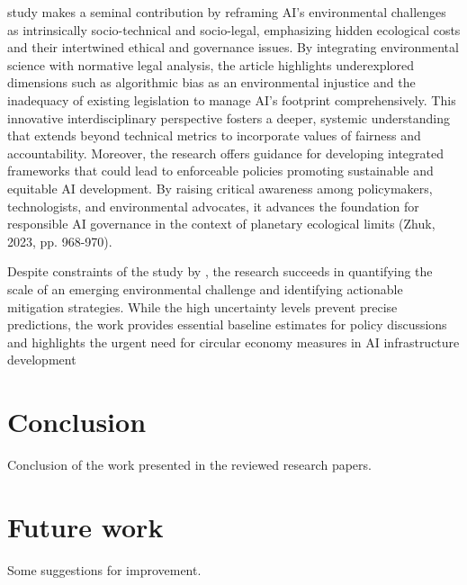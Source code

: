 \documentclass[a4paper, 12pt]{article}
\begin{document}
\par \citet{Zhuk2023} study makes a seminal contribution by reframing AI’s environmental challenges as intrinsically socio-technical and socio-legal, emphasizing hidden ecological costs and their intertwined ethical and governance issues. By integrating environmental science with normative legal analysis, the article highlights underexplored dimensions such as algorithmic bias as an environmental injustice and the inadequacy of existing legislation to manage AI’s footprint comprehensively. This innovative interdisciplinary perspective fosters a deeper, systemic understanding that extends beyond technical metrics to incorporate values of fairness and accountability. Moreover, the research offers guidance for developing integrated frameworks that could lead to enforceable policies promoting sustainable and equitable AI development. By raising critical awareness among policymakers, technologists, and environmental advocates, it advances the foundation for responsible AI governance in the context of planetary ecological limits (Zhuk, 2023, pp. 968-970).
\par Despite constraints of the study by \cite{wang_2024_ewaste}, the research succeeds in quantifying the scale of an emerging environmental challenge and identifying actionable mitigation strategies. While the high uncertainty levels prevent precise predictions, the work provides essential baseline estimates for policy discussions and highlights the urgent need for circular economy measures in AI infrastructure development

\section{Conclusion}
Conclusion of the work presented in the reviewed research papers.

\section{Future work}
Some suggestions for improvement.

\printbibliography
\end{document}
